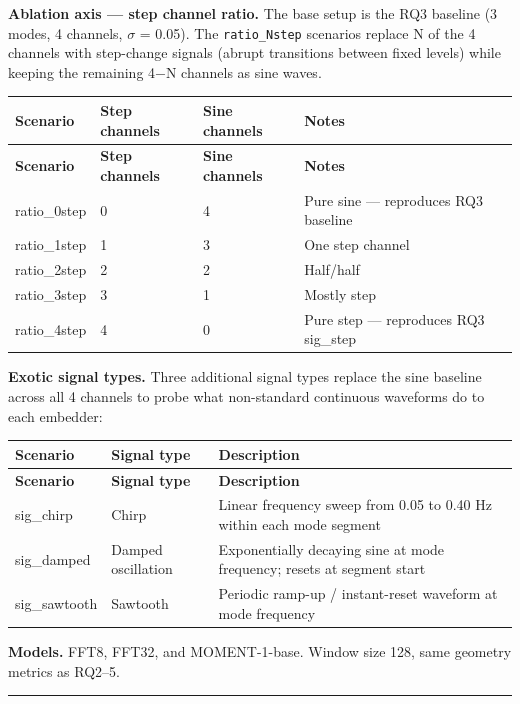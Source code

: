 \documentclass[11pt,a4paper]{article}
\begin{document}
\textbf{Ablation axis --- step channel ratio.} The base setup is the RQ3 baseline (3 modes, 4 channels,
$\sigma$ = 0.05). The \texttt{ratio\_Nstep} scenarios replace N of the 4 channels with step-change signals
(abrupt transitions between fixed levels) while keeping the remaining 4$-$N channels as sine waves.

\begin{longtable}{|l|l|l|l|}
\hline
\textbf{Scenario} & \textbf{Step channels} & \textbf{Sine channels} & \textbf{Notes} \\
\hline
\endfirsthead
\hline
\textbf{Scenario} & \textbf{Step channels} & \textbf{Sine channels} & \textbf{Notes} \\
\hline
\endhead
\hline
\endfoot
ratio\_0step & 0 & 4 & Pure sine --- reproduces RQ3 baseline \\
\hline
ratio\_1step & 1 & 3 & One step channel \\
\hline
ratio\_2step & 2 & 2 & Half/half \\
\hline
ratio\_3step & 3 & 1 & Mostly step \\
\hline
ratio\_4step & 4 & 0 & Pure step --- reproduces RQ3 sig\_step \\
\hline
\end{longtable}

\textbf{Exotic signal types.} Three additional signal types replace the sine baseline across all
4 channels to probe what non-standard continuous waveforms do to each embedder:

\begin{longtable}{|l|l|l|}
\hline
\textbf{Scenario} & \textbf{Signal type} & \textbf{Description} \\
\hline
\endfirsthead
\hline
\textbf{Scenario} & \textbf{Signal type} & \textbf{Description} \\
\hline
\endhead
\hline
\endfoot
sig\_chirp & Chirp & Linear frequency sweep from 0.05 to 0.40 Hz within each mode segment \\
\hline
sig\_damped & Damped oscillation & Exponentially decaying sine at mode frequency; resets at segment start \\
\hline
sig\_sawtooth & Sawtooth & Periodic ramp-up / instant-reset waveform at mode frequency \\
\hline
\end{longtable}

\textbf{Models.} FFT8, FFT32, and MOMENT-1-base. Window size 128, same geometry metrics as RQ2--5.

\vspace{4pt}\hrule\vspace{4pt}
\end{document}
